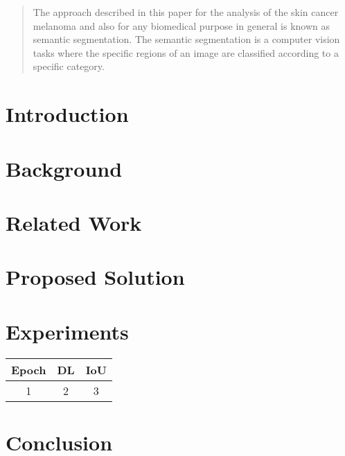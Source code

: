 \date{Received: date / Accepted: date}


\maketitle

\begin{abstract}
  The approach described in this paper for the analysis of the skin cancer melanoma and also for any biomedical purpose in general is known as semantic segmentation. The semantic segmentation is a computer vision tasks where the specific regions of an image are classified according to a specific category. 

\end{abstract}

\section{Introduction}
\blindtext
\section{Background}
\blindtext
\section{Related Work}
\blindtext
\section{Proposed Solution}
\blindtext
\section{Experiments}
\blindtext

\begin{table}[h]
  \centering
  \begin{tabular}{c c c}
    \toprule
    \textbf{Epoch} & \textbf{DL} & \textbf{IoU} \\
    \midrule
    1 & 2 & 3\\
    
  \end{tabular}
\end{table}
\section{Conclusion}
